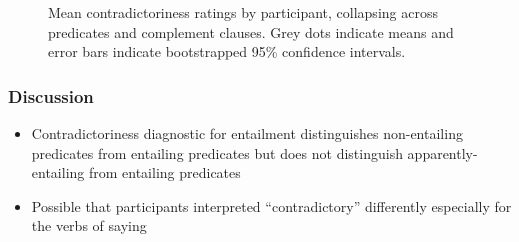 \documentclass[11pt,fleqn]{article}
\newcommand{\6}{\mbox{$[\hspace*{-.6mm}[$}}
\newcommand{\9}{\mbox{$]\hspace*{-.6mm}]$}}
\begin{document}
\begin{figure}[h!]
\centering



\caption{Mean contradictoriness ratings by participant, collapsing across predicates and complement clauses. Grey dots indicate means and error bars indicate bootstrapped 95\% confidence intervals.}
\label{f-contradict-participant}
\end{figure}

\subsubsection{Discussion}

\begin{itemize}

\item Contradictoriness diagnostic for entailment distinguishes non-entailing predicates from entailing predicates but does not distinguish apparently-entailing from entailing predicates

\item Possible that participants interpreted ``contradictory'' differently especially for the verbs of saying

\end{itemize}
\end{document}

